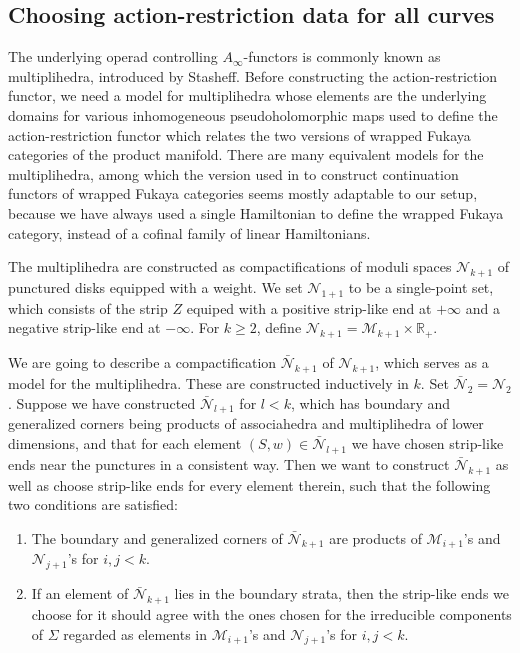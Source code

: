 \documentclass{amsart}
\numberwithin{equation}{section}
\numberwithin{figure}{section}
\begin{document}
\subsection{Choosing action-restriction data for all curves}
	The underlying operad controlling $A_{\infty}$-functors is commonly known as multiplihedra, introduced by Stasheff. Before constructing the action-restriction functor, we need a model for multiplihedra whose elements are the underlying domains for various inhomogeneous pseudoholomorphic maps used to define the action-restriction functor which relates the two versions of wrapped Fukaya categories of the product manifold. There are many equivalent models for the multiplihedra, among which the version used in \cite{Sylvan} to construct continuation functors of wrapped Fukaya categories seems mostly adaptable to our setup, because we have always used a single Hamiltonian to define the wrapped Fukaya category, instead of a cofinal family of linear Hamiltonians. \par
	The multiplihedra are constructed as compactifications of moduli spaces $\mathcal{N}_{k+1}$ of punctured disks equipped with a weight. We set $\mathcal{N}_{1+1}$ to be a single-point set, which consists of the strip $Z$ equiped with a positive strip-like end at $+\infty$ and a negative strip-like end at $-\infty$. For $k \ge 2$, define $\mathcal{N}_{k+1}=\mathcal{M}_{k+1} \times \mathbb{R}_{+}$. \par
	We are going to describe a compactification $\bar{\mathcal{N}}_{k+1}$ of $\mathcal{N}_{k+1}$, which serves as a model for the multiplihedra. These are constructed inductively in $k$. Set $\bar{\mathcal{N}}_{2} = \mathcal{N}_{2}$. Suppose we have constructed $\bar{\mathcal{N}}_{l+1}$ for $l<k$, which has boundary and generalized corners being products of associahedra and multiplihedra of lower dimensions, and that for each element $(S, w) \in \bar{\mathcal{N}}_{l+1}$ we have chosen strip-like ends near the punctures in a consistent way. Then we want to construct $\bar{\mathcal{N}}_{k+1}$ as well as choose strip-like ends for every element therein, such that the following two conditions are satisfied:
\begin{enumerate}[label=(\roman*)]

\item The boundary and generalized corners of $\bar{\mathcal{N}}_{k+1}$ are products of $\mathcal{M}_{i+1}$'s and $\mathcal{N}_{j+1}$'s for $i, j < k$. 

\item If an element of $\bar{\mathcal{N}}_{k+1}$ lies in the boundary strata, then the strip-like ends we choose for it should agree with the ones chosen for the irreducible components of $\Sigma$ regarded as elements in $\mathcal{M}_{i+1}$'s and $\mathcal{N}_{j+1}$'s for $i, j < k$.

\end{enumerate}
\end{document}
